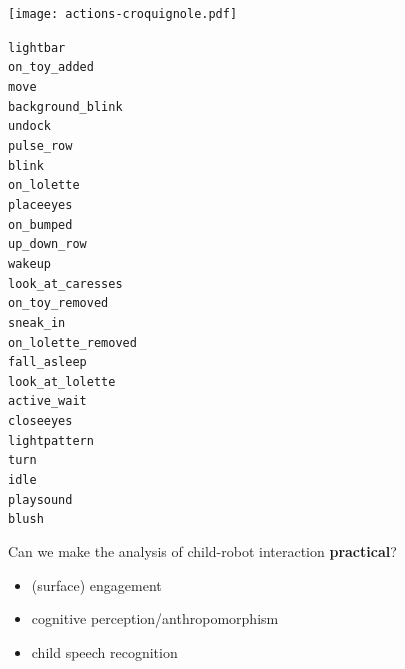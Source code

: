 \documentclass[handout,compress]{beamer}
\begin{document}
{
\begin{frame}{}
    \centering
    \texttt{[image: actions-croquignole.pdf]}

    \begin{multicols}{3}
\scriptsize
{\tt lightbar} \\
{\tt on\_toy\_added} \\
{\tt move} \\
{\tt background\_blink} \\
{\tt undock} \\
{\tt pulse\_row} \\
{\tt blink} \\
{\tt on\_lolette} \\
{\tt placeeyes} \\
{\tt on\_bumped} \\
{\tt up\_down\_row} \\
{\tt wakeup} \\
{\tt look\_at\_caresses} \\
{\tt on\_toy\_removed} \\
{\tt sneak\_in} \\
{\tt on\_lolette\_removed} \\
{\tt fall\_asleep} \\
{\tt look\_at\_lolette} \\
{\tt active\_wait} \\
{\tt closeeyes} \\
{\tt lightpattern} \\
{\tt turn} \\
{\tt idle} \\
{\tt playsound} \\
{\tt blush}

    \end{multicols}
\end{frame}
}


\begin{frame}{}

    \begin{center}

        Can we make the analysis of child-robot interaction {\bf practical}?

        \begin{itemize}
            \item (surface) engagement
            \item cognitive perception/anthropomorphism
            \item child speech recognition
        \end{itemize}

    \end{center}

\end{frame}
\end{document}
